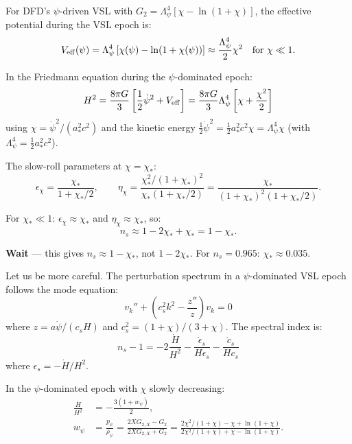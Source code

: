 \documentclass[11pt,a4paper]{article}
\begin{document}
For DFD's $\psi$-driven VSL with $G_2 = \Lambda_\psi^4[\chi - \ln(1+\chi)]$, the effective potential during the VSL epoch is:
\begin{equation}
V_{\rm eff}(\psi) = \Lambda_\psi^4\left[\chi(\psi) - \ln(1+\chi(\psi))\right] \approx \frac{\Lambda_\psi^4}{2}\chi^2 \quad \text{for } \chi \ll 1.
\end{equation}

In the Friedmann equation during the $\psi$-dominated epoch:
\begin{equation}
H^2 = \frac{8\pi G}{3}\left[\frac{1}{2}\dot\psi^2 + V_{\rm eff}\right] = \frac{8\pi G}{3}\Lambda_\psi^4\left[\chi + \frac{\chi^2}{2}\right]
\end{equation}
using $\chi = \dot\psi^2/(a_*^2 c^2)$ and the kinetic energy $\frac{1}{2}\dot\psi^2 = \frac{1}{2}a_*^2 c^2\chi = \Lambda_\psi^4\chi$ (with $\Lambda_\psi^4 = \frac{1}{2}a_*^2 c^2$).

The slow-roll parameters at $\chi = \chi_*$:
\begin{equation}
\epsilon_\chi = \frac{\chi_*}{1 + \chi_*/2}, \qquad \eta_\chi = \frac{\chi_*^2/(1+\chi_*)^2}{\chi_*(1 + \chi_*/2)} = \frac{\chi_*}{(1+\chi_*)^2(1+\chi_*/2)}.
\end{equation}

For $\chi_* \ll 1$: $\epsilon_\chi \approx \chi_*$ and $\eta_\chi \approx \chi_*$, so:
\begin{equation}
n_s \approx 1 - 2\chi_* + \chi_* = 1 - \chi_*.
\end{equation}

\textbf{Wait} --- this gives $n_s \approx 1 - \chi_*$, not $1 - 2\chi_*$. For $n_s = 0.965$: $\chi_* \approx 0.035$.

Let us be more careful. The perturbation spectrum in a $\psi$-dominated VSL epoch follows the mode equation:
\begin{equation}
v_k'' + \left(c_s^2 k^2 - \frac{z''}{z}\right)v_k = 0
\end{equation}
where $z = a\dot\psi/(c_s H)$ and $c_s^2 = (1+\chi)/(3+\chi)$. The spectral index is:
\begin{equation}
n_s - 1 = -2\frac{\dot H}{H^2} - \frac{\dot\epsilon_s}{H\epsilon_s} - \frac{\dot c_s}{Hc_s}
\end{equation}
where $\epsilon_s = -\dot H/H^2$.

In the $\psi$-dominated epoch with $\chi$ slowly decreasing:
\begin{align}
\frac{\dot H}{H^2} &= -\frac{3(1+w_\psi)}{2}, \\
w_\psi &= \frac{p_\psi}{\rho_\psi} = \frac{2X G_{2,X} - G_2}{2X G_{2,X} + G_2} = \frac{2\chi^2/(1+\chi) - \chi + \ln(1+\chi)}{2\chi^2/(1+\chi) + \chi - \ln(1+\chi)}.
\end{align}
\end{document}
